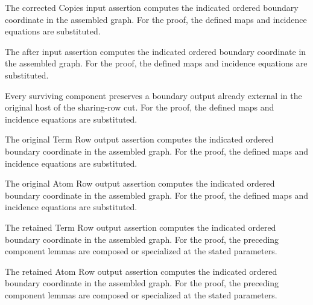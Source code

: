 The corrected Copies input assertion computes the indicated ordered boundary coordinate in the assembled graph.
For the proof, the defined maps and incidence equations are substituted.
\par{}

The after input assertion computes the indicated ordered boundary coordinate in the assembled graph.
For the proof, the defined maps and incidence equations are substituted.
\par{}

Every surviving component preserves a boundary output already external in the original host of the sharing-row cut.
For the proof, the defined maps and incidence equations are substituted.
\par{}

The original Term Row output assertion computes the indicated ordered boundary coordinate in the assembled graph.
For the proof, the defined maps and incidence equations are substituted.
\par{}

The original Atom Row output assertion computes the indicated ordered boundary coordinate in the assembled graph.
For the proof, the defined maps and incidence equations are substituted.
\par{}

The retained Term Row output assertion computes the indicated ordered boundary coordinate in the assembled graph.
For the proof, the preceding component lemmas are composed or specialized at the stated parameters.
\par{}

The retained Atom Row output assertion computes the indicated ordered boundary coordinate in the assembled graph.
For the proof, the preceding component lemmas are composed or specialized at the stated parameters.
\par{}

